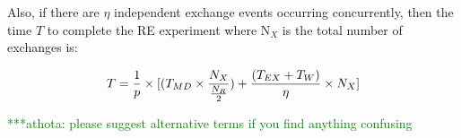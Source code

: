 \documentclass{rspublic}
\newcommand{\jhanote}[1]{ {\textcolor{red} { ***shantenu: #1 }}}
\newcommand{\alnote}[1]{ {\textcolor{blue} { ***andre: #1 }}}
\newcommand{\athotanote}[1]{ {\textcolor{green} { ***athota: #1 }}}
\newcommand{\alnote}[1]{}
\newcommand{\athotanote}[1]{}
\newcommand{\jhanote}[1]{}
\begin{document}
Also, if there are $\eta$ independent exchange events occurring
concurrently, then the time $T$ to complete the RE experiment where N$_X$ is the total number of exchanges is:

\begin{eqnarray}
T = {1\over p} \times [(T_{MD} \times  {N_X \over {N_R \over 2}}) + {(T_{EX} + T_{W}) \over \eta} \times N_X]
\label{eq:totaltime2}
\end{eqnarray}

\athotanote{please suggest alternative terms if you find anything confusing}







\end{document}
